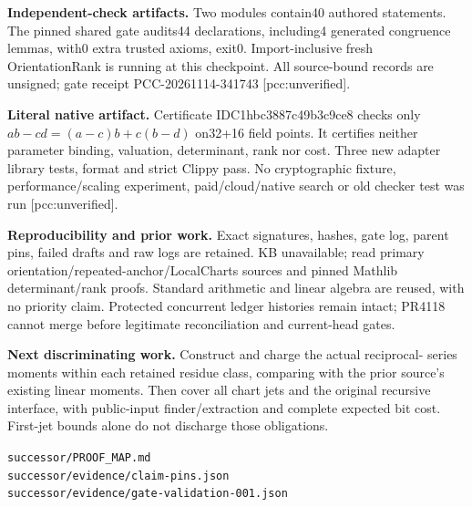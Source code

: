 \documentclass[10pt]{article}
\begin{document}
\textbf{Independent-check artifacts.} Two modules contain40 authored
statements. The pinned shared gate audits44 declarations, including4
generated congruence lemmas, with0 extra trusted axioms, exit0. Import-inclusive
fresh OrientationRank is running at this checkpoint. All source-bound records
are unsigned; gate receipt PCC-20261114-341743 [pcc:unverified].

\textbf{Literal native artifact.} Certificate IDC1hbc3887c49b3c9ce8 checks
only $ab-cd=(a-c)b+c(b-d)$ on32+16 field points. It certifies neither
parameter binding, valuation, determinant, rank nor cost. Three new adapter
library tests, format and strict Clippy pass. No cryptographic fixture,
performance/scaling experiment, paid/cloud/native search or old checker test
was run [pcc:unverified].

\textbf{Reproducibility and prior work.} Exact signatures, hashes, gate log,
parent pins, failed drafts and raw logs are retained. KB unavailable; read
primary orientation/repeated-anchor/LocalCharts sources and pinned Mathlib
determinant/rank proofs. Standard arithmetic and linear algebra are reused,
with no priority claim. Protected concurrent ledger histories remain intact;
PR4118 cannot merge before legitimate reconciliation and current-head gates.

\textbf{Next discriminating work.} Construct and charge the actual reciprocal-
series moments within each retained residue class, comparing with the prior
source's existing linear moments. Then cover all chart jets and the original
recursive interface, with public-input finder/extraction and complete expected
bit cost. First-jet bounds alone do not discharge those obligations.

{\small\texttt{successor/PROOF\_MAP.md}\\
\texttt{successor/evidence/claim-pins.json}\\
\texttt{successor/evidence/gate-validation-001.json}}
\end{document}
